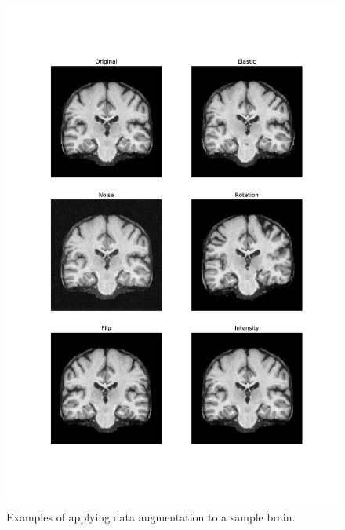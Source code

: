\begin{figure}
    \centering
    \includegraphics[width=1.0\textwidth]{figures/dataset/data_augmentation_example.pdf}
    \caption{Examples of applying data augmentation to a sample brain.}
    \label{fig:data_augmentation_example}
\end{figure}
